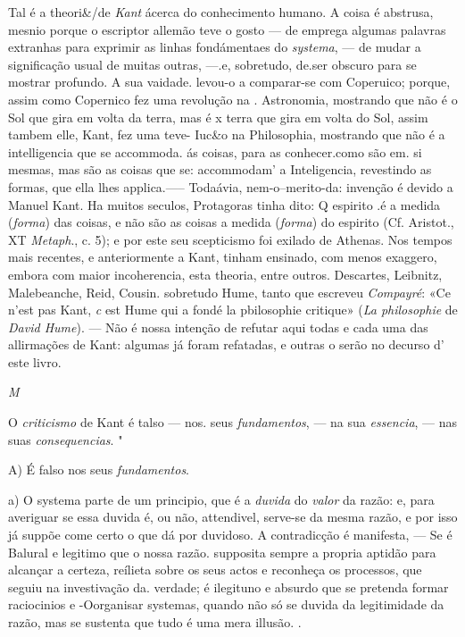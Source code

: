 Tal é a theori\&/de \emph{Kant} ácerca do conhecimento humano. A coisa é \textbar{} abstrusa, mesnio porque o escriptor allemão teve o gosto --- de emprega algumas palavras extranhas para exprimir as linhas fondámentaes do \emph{systema}, --- de mudar a significação usual de muitas outras, ---.e, sobretudo, de.ser obscuro para se mostrar profundo. A sua vaidade. levou-o a comparar-se com Coperuico; porque, assim como Copernico fez uma revolução na . Astronomia, mostrando que não é o Sol que gira em volta da terra, mas é x terra que gira em volta do Sol, assim tambem elle, Kant, fez uma teve- Iuc\&o na Philosophia, mostrando que não é a intelligencia que se accommoda. ás coisas, para as conhecer.como são em. si mesmas, mas são as coisas que se: accommodam' a Inteligencia, revestindo as formas, que ella lhes applica.----- Todaávia, nem-o--merito-da: invenção é devido a Manuel Kant. Ha muitos seculos, Protagoras tinha dito: Q espirito .é a medida (\emph{forma}) das coisas, e não são as coisas a medida (\emph{forma}) do espirito (Cf. Aristot., XT \emph{Metaph}., c. 5); e por este seu scepticismo foi exilado de Athenas. Nos tempos mais recentes, e anteriormente a Kant, tinham ensinado, com menos exaggero, embora com maior incoherencia, esta theoria, entre outros. Descartes, Leibnitz, Malebeanche, Reid, Cousin. sobretudo Hume, tanto que escreveu \emph{Compayré}: «Ce n'est pas Kant, \emph{c} est Hume qui a fondé la pbilosophie critique» (\emph{La philosophie} de \emph{David Hume}). --- Não é nossa intenção de refutar aqui todas e cada uma das allirmações de Kant: algumas já foram refatadas, e outras o serão no decurso d' este livro.

\emph{M}

O \emph{criticismo} de Kant é talso --- nos. seus \emph{fundamentos}, --- na sua \emph{essencia}, --- nas suas \emph{consequencias}. "

A) É falso nos seus \emph{fundamentos}.

a) O systema parte de um principio, que é a \emph{duvida} do \emph{valor} da razão: e, para averiguar se essa duvida é, ou não, attendivel, serve-se da mesma razão, e por isso já suppõe come certo o que dá por duvidoso. A contradicção é manifesta, --- Se é Balural e legitimo que o nossa razão. supposita sempre a propria aptidão para alcançar a certeza, reílieta sobre os seus actos e reconheça os processos, que seguiu na investivação da. verdade; é ilegituno e absurdo que se pretenda formar raciocinios e -Oorganisar systemas, quando não só se duvida da legitimidade da razão, mas se sustenta que tudo é uma mera illusão. .

